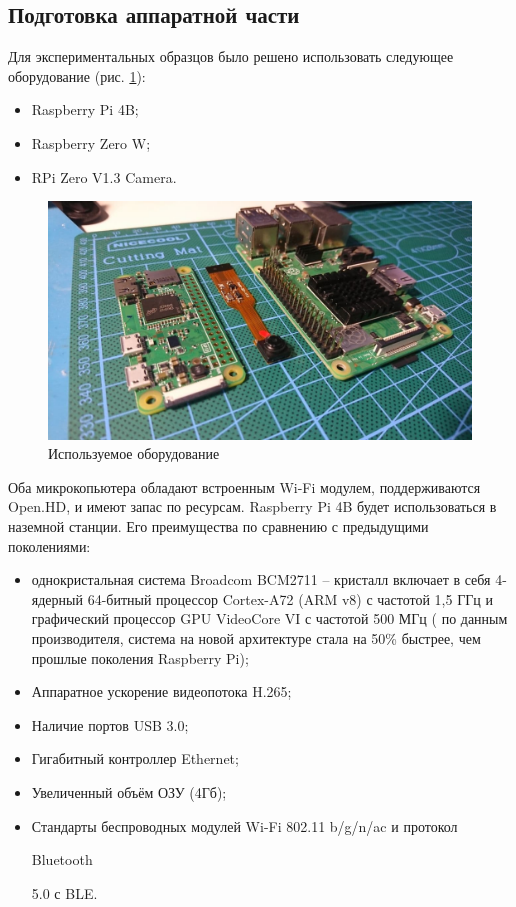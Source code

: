 \subsection{Подготовка аппаратной части}

Для экспериментальных образцов было решено использовать следующее оборудование (рис. \ref{fig:photo1}):
\begin{itemize}
	\item Raspberry Pi 4B;
	\item Raspberry Zero W;
	\item RPi Zero V1.3 Camera.
\end{itemize}

\begin{figure}[H]
	\centering
	\includegraphics[width=0.5\linewidth]{pics/photo1}
	\caption{ Используемое оборудование
	}
	\label{fig:photo1}
\end{figure}

Оба микрокопьютера обладают встроенным Wi-Fi модулем, поддерживаются Open.HD, и имеют запас по ресурсам.
Raspberry Pi 4B будет использоваться в наземной станции. Его преимущества по сравнению с предыдущими поколениями:
\begin{itemize}
	 \item однокристальная система Broadcom BCM2711 -- кристалл включает в себя 4-ядерный 64-битный процессор Cortex-A72 (ARM v8) с частотой 1,5 ГГц и графический процессор GPU VideoCore VI с частотой 500 МГц ( по данным производителя, система на новой архитектуре стала на 50\% быстрее, чем прошлые поколения Raspberry Pi);
	\item Аппаратное ускорение видеопотока H.265;
	\item Наличие портов USB 3.0;
	\item Гигабитный контроллер Ethernet;
	\item Увеличенный объём ОЗУ (4Гб);
	\item Стандарты беспроводных модулей Wi-Fi 802.11 b/g/n/ac и протокол 
	\begin{otherlanguage}{english}
		Bluetooth
	\end{otherlanguage}
	5.0 с BLE.
\end{itemize}

